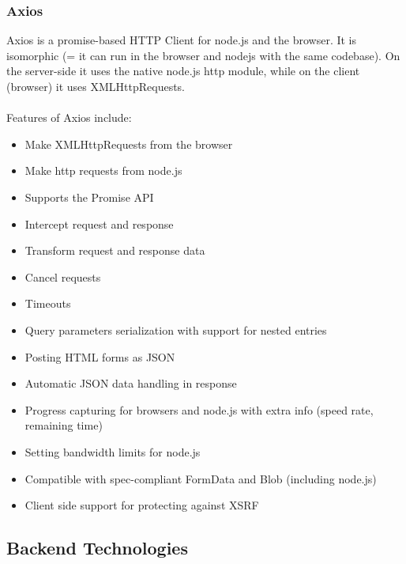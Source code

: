 \subsubsection{Axios}
Axios is a promise-based HTTP Client for node.js and the browser. It is isomorphic (= it can run in the browser and nodejs with the same codebase). On the server-side it uses the native node.js http module, while on the client (browser) it uses XMLHttpRequests.\cite{axios}\\\\
Features of Axios include:
\begin{itemize}
  \item Make XMLHttpRequests from the browser
  \item Make http requests from node.js
  \item Supports the Promise API
  \item Intercept request and response
  \item Transform request and response data
  \item Cancel requests
  \item Timeouts
  \item Query parameters serialization with support for nested entries
  \item Posting HTML forms as JSON
  \item Automatic JSON data handling in response
  \item Progress capturing for browsers and node.js with extra info (speed rate, remaining time)
  \item Setting bandwidth limits for node.js
  \item Compatible with spec-compliant FormData and Blob (including node.js)
  \item Client side support for protecting against XSRF
\end{itemize}

\subsection{Backend Technologies}
